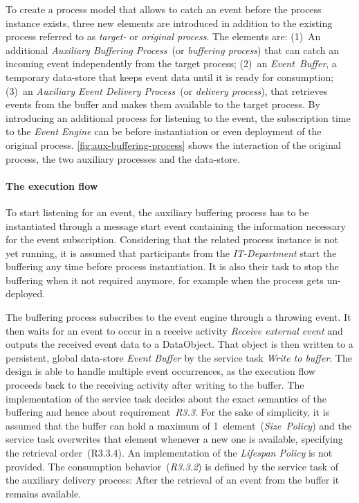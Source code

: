 To create a process model that allows to catch an event before the process instance exists, three new elements are introduced in addition to the existing process referred to as \textit{target-} or \textit{original process}. The elements are: (1)~An additional \textit{Auxiliary Buffering Process}~(or \textit{buffering process}) that can catch an incoming event independently from the target process; (2)~an \textit{Event~Buffer}, a temporary data-store that keeps event data until it is ready for consumption; (3)~an \textit{Auxiliary Event Delivery Process}~(or \textit{delivery process}), that retrieves events from the buffer and makes them available to the target process.
By introducing an additional process for listening to the event, the subscription time to the \textit{Event Engine} can be before instantiation or even deployment of the original process.
\autoref{fig:aux-buffering-process} shows the interaction of the original process, the two auxiliary processes and the data-store.

\paragraph{The execution flow}
To start listening for an event, the auxiliary buffering process has to be instantiated through a message start event containing the information necessary for the event subscription. Considering that the related process instance is not yet running, it is assumed that participants from the \textit{IT-Department} start the buffering any time before process instantiation.
It is also their task to stop the buffering when it not required anymore, for example when the process gets un-deployed.

The buffering process subscribes to the event engine through a throwing event. It then waits for an event to occur in a receive activity \textit{Receive external event} and outputs the received event data to a DataObject. That object is then written to a persistent, global data-store \textit{Event Buffer} by the service task \textit{Write to buffer}. 
The design is able to handle multiple event occurrences, as the execution flow proceeds back to the receiving activity after writing to the buffer.
The implementation of the service task decides about the exact semantics of the buffering and hence about requirement~\textit{R3.3}. For the sake of simplicity, it is assumed that the buffer can hold a maximum of 1~element~(\textit{Size~Policy}) and the service task overwrites that element whenever a new one is available, specifying the retrieval order~(R3.3.4).
An implementation of the \textit{Lifespan Policy} is not provided. 
The consumption behavior~(\textit{R3.3.2}) is defined by the service task of the auxiliary delivery process: After the retrieval of an event from the buffer it remains available.

